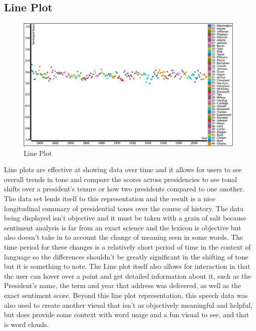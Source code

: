 \subsection{Line Plot}
\begin{figure}
  \includegraphics[width=\columnwidth]{images/Lineplot.png}
  \caption{Line Plot}
  \label{fig:lineplot1}
\end{figure}
Line plots are effective at showing data over time and it allows for users to see overall trends in tone and compare the scores across presidencies to see tonal shifts over a president's tenure or how two presidents compared to one another.
The data set lends itself to this representation and the result is a nice longitudinal summary of presidential tones over the course of history.
The data being displayed isn't objective and it must be taken with a grain of salt because sentiment analysis is far from an exact science and the lexicon is objective but also doesn't take in to account the change of meaning seen in some words.
The time period for these changes is a relatively short period of time in the context of language so the differences shouldn't be greatly significant in the shifting of tone but it is something to note.
The Line plot itself also allows for interaction in that the user can hover over a point and get detailed information about it, such as the President's name, the term and year that address was delivered, as well as the exact sentiment score.
Beyond this line plot representation, this speech data was also used to create another visual that isn't as objectively meaningful and helpful, but does provide some context with word usage and a fun visual to see, and that is word clouds.

